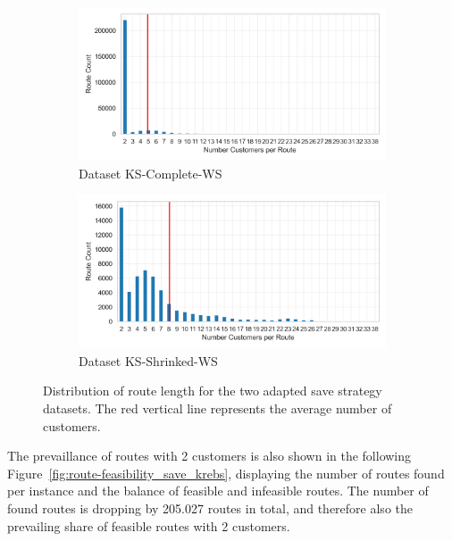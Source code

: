 \begin{figure}[ht]
    \centering
    \begin{subfigure}[t]{.5\textwidth}
        \centering
        \includegraphics[width=\linewidth]{pictures/dataset_structure/no_cust_plot_krebs_28880_600_WS.png}
        \caption{Dataset KS-Complete-WS}
        \label{fig:ds-a-krebs}
    \end{subfigure}%
    \begin{subfigure}[t]{.5\textwidth}
        \centering
        \includegraphics[width=\linewidth]{pictures/dataset_structure/no_cust_plot_krebs_28880_600_WS_shrinked094.png}
        \caption{Dataset KS-Shrinked-WS}
        \label{fig:ds-b-krebs}
    \end{subfigure}
    \caption{Distribution of route length for the two adapted save strategy datasets. The red vertical line represents the average
        number of customers.}
    \label{fig:route-dists_save_krebs}
\end{figure}

The prevaillance of routes with 2 customers is also shown in the following Figure~\ref{fig:route-feasibility_save_krebs}, displaying the number of routes found per instance and
the balance of feasible and infeasible routes. The number of found routes is dropping by 205.027 routes in total, and therefore
also the prevailing share of feasible routes with 2 customers.

